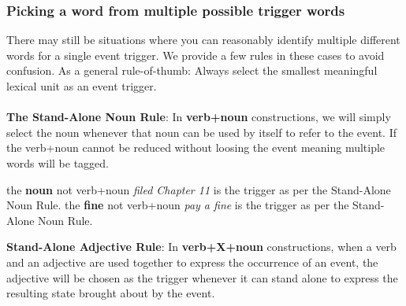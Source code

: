 

\subsubsection{Picking a word from multiple possible trigger words}

There may still be situations where you can reasonably identify multiple different words for a single event trigger. We provide a few rules in these cases to avoid confusion. As a general rule-of-thumb: Always select the smallest meaningful lexical unit as an event trigger.
\\\\
\noindent\textbf{The Stand-Alone Noun Rule}:
In \textbf{verb+noun} constructions, we will simply select the noun whenever that noun can be used by itself to refer to the event.
If the verb+noun cannot be reduced without loosing the event meaning multiple words will be tagged.

\begin{exe}
    \ex {}
        \expl the \textbf{noun}  not verb+noun \textit{filed Chapter 11} is the trigger as per the Stand-Alone Noun Rule.
    \ex {}
        \expl the \textbf{fine}  not verb+noun \textit{pay a fine} is the trigger as per the Stand-Alone Noun Rule.
\end{exe}

\noindent\textbf{Stand-Alone Adjective Rule}:
In \textbf{verb+X+noun} constructions, when a verb and an adjective are used together to express the occurrence of an event, the adjective will be chosen as the trigger whenever it can stand alone to express the resulting state brought about by the event.

